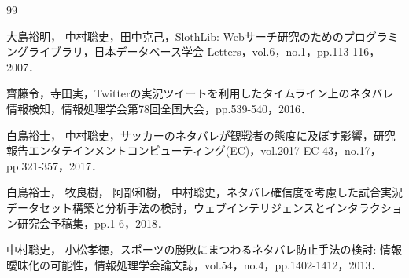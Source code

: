 \begin{thebibliography}{99}
{ 大島裕明， 中村聡史，田中克己，SlothLib: Webサーチ研究のためのプログラミングライブラリ，日本データベース学会 Letters，vol.6，no.1，pp.113-116，2007．

 齊藤令，寺田実，Twitterの実況ツイートを利用したタイムライン上のネタバレ情報検知，情報処理学会第78回全国大会，pp.539-540，2016．

 白鳥裕士， 中村聡史，サッカーのネタバレが観戦者の態度に及ぼす影響，研究報告エンタテインメントコンピューティング(EC)，vol.2017-EC-43，no.17，pp.321-357，2017．

 白鳥裕士， 牧良樹， 阿部和樹， 中村聡史，ネタバレ確信度を考慮した試合実況データセット構築と分析手法の検討，ウェブインテリジェンスとインタラクション研究会予稿集，pp.1-6，2018．

 中村聡史， 小松孝徳，スポーツの勝敗にまつわるネタバレ防止手法の検討: 情報曖昧化の可能性，情報処理学会論文誌，vol.54，no.4，pp.1402-1412，2013．
}

\end{thebibliography}